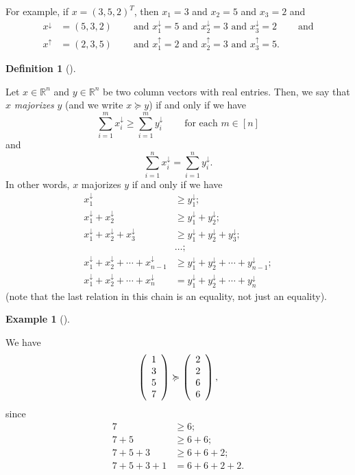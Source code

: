 \documentclass[numbers=enddot,12pt,final,onecolumn,notitlepage]{scrartcl}%
\numberwithin{exer}{subsection}
\theoremstyle{definition}
\newtheorem{defi}[theo]{Definition}
\newenvironment{definition}[1][]
{\begin{defi}[#1]\begin{leftbar}}
{\end{leftbar}\end{defi}}
\newtheorem{exam}[theo]{Example}
\newenvironment{example}[1][]
{\begin{exam}[#1]\begin{leftbar}}
{\end{leftbar}\end{exam}}
\let\sumnonlimits\sum
\renewcommand{\sum}{\sumnonlimits\limits}
\begin{document}
For example, if $x=\left(  3,5,2\right)  ^{T}$, then $x_{1}=3$ and $x_{2}=5$
and $x_{3}=2$ and%
\begin{align*}
x^{\downarrow}  &  =\left(  5,3,2\right)  \ \ \ \ \ \ \ \ \ \ \text{and }%
x_{1}^{\downarrow}=5\text{ and }x_{2}^{\downarrow}=3\text{ and }%
x_{3}^{\downarrow}=2\ \ \ \ \ \ \ \ \ \ \text{and}\\
x^{\uparrow}  &  =\left(  2,3,5\right)  \ \ \ \ \ \ \ \ \ \ \text{and }%
x_{1}^{\uparrow}=2\text{ and }x_{2}^{\uparrow}=3\text{ and }x_{3}^{\uparrow
}=5.
\end{align*}


\begin{definition}
\label{def.major.major}Let $x\in\mathbb{R}^{n}$ and $y\in\mathbb{R}^{n}$ be
two column vectors with real entries. Then, we say that $x$ \emph{majorizes}
$y$ (and we write $x\succcurlyeq y$) if and only if we have%
\[
\sum_{i=1}^{m}x_{i}^{\downarrow}\geq\sum_{i=1}^{m}y_{i}^{\downarrow
}\ \ \ \ \ \ \ \ \ \ \text{for each }m\in\left[  n\right]
\]
and%
\[
\sum_{i=1}^{n}x_{i}^{\downarrow}=\sum_{i=1}^{n}y_{i}^{\downarrow}.
\]
In other words, $x$ majorizes $y$ if and only if we have%
\begin{align*}
x_{1}^{\downarrow}  &  \geq y_{1}^{\downarrow};\\
x_{1}^{\downarrow}+x_{2}^{\downarrow}  &  \geq y_{1}^{\downarrow}%
+y_{2}^{\downarrow};\\
x_{1}^{\downarrow}+x_{2}^{\downarrow}+x_{3}^{\downarrow}  &  \geq
y_{1}^{\downarrow}+y_{2}^{\downarrow}+y_{3}^{\downarrow};\\
&  \ldots;\\
x_{1}^{\downarrow}+x_{2}^{\downarrow}+\cdots+x_{n-1}^{\downarrow}  &  \geq
y_{1}^{\downarrow}+y_{2}^{\downarrow}+\cdots+y_{n-1}^{\downarrow};\\
x_{1}^{\downarrow}+x_{2}^{\downarrow}+\cdots+x_{n}^{\downarrow}  &
=y_{1}^{\downarrow}+y_{2}^{\downarrow}+\cdots+y_{n}^{\downarrow}%
\end{align*}
(note that the last relation in this chain is an equality, not just an equality).
\end{definition}

\begin{example}
We have%
\[
\left(
\begin{array}
[c]{c}%
1\\
3\\
5\\
7
\end{array}
\right)  \succcurlyeq\left(
\begin{array}
[c]{c}%
2\\
2\\
6\\
6
\end{array}
\right)  ,
\]
since%
\begin{align*}
7  &  \geq6;\\
7+5  &  \geq6+6;\\
7+5+3  &  \geq6+6+2;\\
7+5+3+1  &  =6+6+2+2.
\end{align*}

\end{example}
\end{document}
